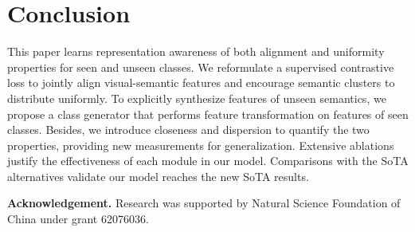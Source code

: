 \documentclass[10pt,twocolumn,letterpaper]{article}
\begin{document}
\section{Conclusion}
This paper learns representation awareness of both alignment and uniformity properties for seen and unseen classes.
We reformulate a supervised contrastive loss to jointly align visual-semantic features and encourage semantic clusters to distribute uniformly.
To explicitly synthesize features of unseen semantics, we propose a class generator that performs feature transformation on features of seen classes.
Besides, we introduce closeness and dispersion to quantify the two properties, providing new measurements for generalization.
Extensive ablations justify the effectiveness of each module in our model.
Comparisons with the SoTA alternatives validate our model reaches the new SoTA results.



{\bf Acknowledgement.}
Research was supported by Natural Science Foundation of China under grant 62076036.

{\small


}
\end{document}
